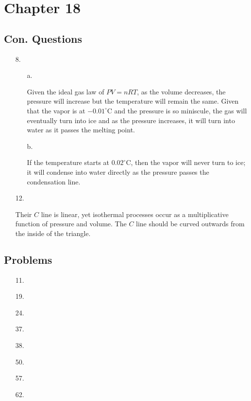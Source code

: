 \documentclass[12pt, letterpaper]{article}
\begin{document}
    \section*{Chapter 18}
    \subsection*{Con. Questions}
    \begin{enumerate}
        \item [8.]
        
        \begin{itemize}
            \item [a.] \mbox{}
            \begin{mdframed}
                Given the ideal gas law of $PV = nRT$, as the volume decreases, the pressure will increase but the temperature will remain the same. Given that the vapor is at $-0.01^{\circ}$C and the pressure is so miniscule, the gas will eventually turn into ice and as the pressure increases, it will turn into water as it passes the melting point.
            \end{mdframed}

            \item[b.] \mbox{}
            \begin{mdframed}
                If the temperature starts at $0.02^{\circ}$C, then the vapor will never turn to ice; it will condense into water directly as the pressure passes the condensation line.
            \end{mdframed}
        \end{itemize}
        \item [12.] \mbox{}
        
        \begin{mdframed}
            Their $C$ line is linear, yet isothermal processes occur as a multiplicative function of pressure and volume. The $C$ line should be curved outwards from the inside of the triangle.
        \end{mdframed}
    \end{enumerate}

    \subsection*{Problems}

    \begin{enumerate}
        \item [11.]
        \item [19.]
        \item [24.]
        \item [37.]
        \item [38.]
        \item [50.]
        \item [57.]
        \item [62.]
    \end{enumerate}
\end{document}
